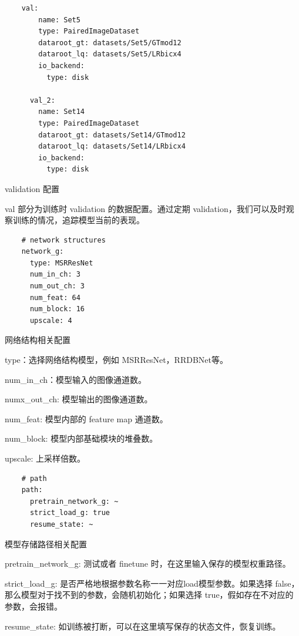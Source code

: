 \documentclass[../main.tex]{subfiles}
\begin{document}
    \begin{verbatim}
    val:
        name: Set5
        type: PairedImageDataset
        dataroot_gt: datasets/Set5/GTmod12
        dataroot_lq: datasets/Set5/LRbicx4
        io_backend:
          type: disk
    
      val_2:
        name: Set14
        type: PairedImageDataset
        dataroot_gt: datasets/Set14/GTmod12
        dataroot_lq: datasets/Set14/LRbicx4
        io_backend:
          type: disk
	\end{verbatim}
	\begin{exampleBox}[righthand ratio=0.00, sidebyside, sidebyside align=center, lower separated=false]{validation 配置}
	
	val 部分为训练时 validation 的数据配置。通过定期 validation，我们可以及时观察训练的情况，追踪模型当前的表现。
    \end{exampleBox}
    \begin{verbatim}
    # network structures
    network_g:
      type: MSRResNet
      num_in_ch: 3
      num_out_ch: 3
      num_feat: 64
      num_block: 16
      upscale: 4
	\end{verbatim}
	\begin{exampleBox}[righthand ratio=0.00, sidebyside, sidebyside align=center, lower separated=false]{网络结构相关配置}
	
	type：选择网络结构模型，例如 MSRResNet，RRDBNet等。
	
	num\_in\_ch：模型输入的图像通道数。
	
	numx\_out\_ch: 模型输出的图像通道数。
    
    num\_feat: 模型内部的 feature map 通道数。
    
    num\_block: 模型内部基础模块的堆叠数。
    
    upscale: 上采样倍数。
    \end{exampleBox}
    \begin{verbatim}
    # path
    path:
      pretrain_network_g: ~
      strict_load_g: true
      resume_state: ~
	\end{verbatim}
	\begin{exampleBox}[righthand ratio=0.00, sidebyside, sidebyside align=center, lower separated=false]{模型存储路径相关配置}
	
	pretrain\_network\_g: 测试或者 finetune 时，在这里输入保存的模型权重路径。
	
    strict\_load\_g: 是否严格地根据参数名称一一对应load模型参数。如果选择 false，那么模型对于找不到的参数，会随机初始化；如果选择 true，假如存在不对应的参数，会报错。
    
    resume\_state: 如训练被打断，可以在这里填写保存的状态文件，恢复训练。
    \end{exampleBox}
\end{document}
